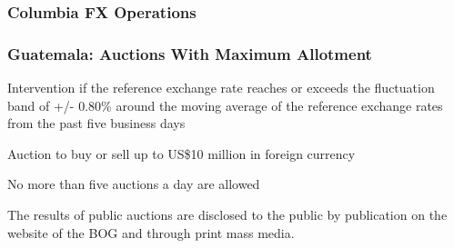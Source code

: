 \documentclass{beamer}
\newenvironment{largeitemize}{\itemize\addtolength{\itemsep}{10pt}}{\enditemize}
\begin{document}
\begin{frame}
  \frametitle{Columbia FX Operations}
\end{frame}


\begin{frame}
  \frametitle{Guatemala: Auctions With Maximum Allotment}
  \begin{largeitemize}
  \item Intervention if the reference exchange rate reaches or exceeds the
    fluctuation band of +/- 0.80\% around the moving average of the reference
    exchange rates from the past five business days
  \item Auction to buy or sell up to US\$10 million in foreign currency
  \item No more than five auctions a day are allowed
  \item The results of public auctions are disclosed to the public by publication on the website of the BOG and through print mass media.    
  \end{largeitemize}  
\end{frame}
\end{document}
